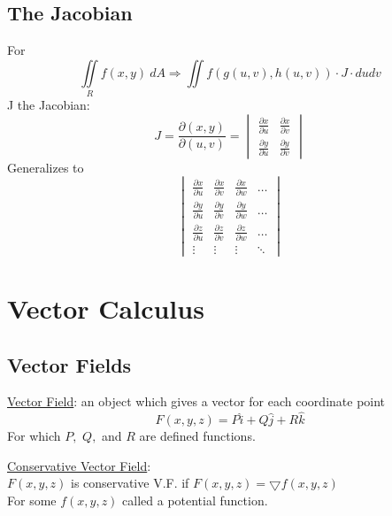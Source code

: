 \documentclass[12pt]{article}
\numberwithin{equation}{subsection}
\newcommand{\indd}{\hspace{2cm}}
\newcommand{\indf}{\hspace{3cm}}
\newcommand{\indn}{\hspace{7cm}}
\begin{document}
\begin{flushleft}
\subsection{The Jacobian}
For
\begin{equation}
\iint \limits_R f(x,y)\ dA \Rightarrow \iint f(g(u,v),h(u,v)) \cdot J \cdot dudv
\end{equation}
J the Jacobian:
\setlength{\delimitershortfall}{0pt}
\begin{equation}
J=\frac{\partial (x,y)}{\partial(u,v)}=\begin{vmatrix}
\frac{\partial x}{\partial u} & \frac{\partial x}{\partial v} \\[2ex]
\frac{\partial y}{\partial u} & \frac{\partial y}{\partial v} 
\end{vmatrix}
\end{equation}
Generalizes to
\begin{equation}
\begin{vmatrix}
\frac{\partial x}{\partial u} & \frac{\partial x}{\partial v} & \frac{\partial x}{\partial w} & \hdots \\[2ex]
\frac{\partial y}{\partial u} & \frac{\partial y}{\partial v} & \frac{\partial y}{\partial w} & \hdots \\[2ex]
\frac{\partial z}{\partial u} & \frac{\partial z}{\partial v} & \frac{\partial z}{\partial w} & \hdots \\[2ex]
\vdots & \vdots &\vdots & \ddots
\end{vmatrix}
\end{equation}

\newpage
\section{Vector Calculus}
\subsection{Vector Fields}
\underline{Vector Field}: an object which gives a vector for each coordinate point
\begin{equation}
F(x,y,z)= P\hat{i} + Q\hat{j} + R\hat{k}
\end{equation}
\indn For which $P,$ $Q,$ and $R$ are defined functions.
\bigskip


 \underline{Conservative Vector Field}:\\
\indd $F(x,y,z)$ is conservative V.F. if $F(x,y,z) = \bigtriangledown f(x,y,z)$\\
\indf For some $f(x,y,z)$ called a potential function.


\end{flushleft}
\end{document}
